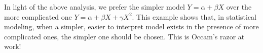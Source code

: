 \documentclass[12pt]{article}
\begin{document}
In light of the above analysis, we prefer the simpler model $Y=\alpha + \beta X$ over the more complicated one $Y=\alpha + \beta X + \gamma X^2$.  This example shows that, in statistical modeling, when a simpler, easier to interpret model exists in the presence of more complicated ones, the simpler one should be chosen.  This is Occam's razor at work!
\end{document}
